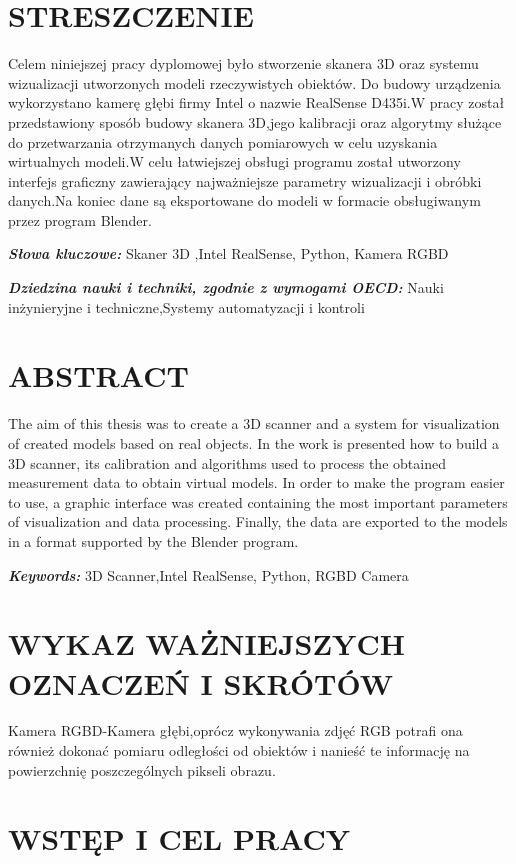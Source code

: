 \documentclass[12pt]{article}
\providecommand{\keywordspl}[1]
{
  \small	
  \textbf{\textit{Słowa kluczowe:}} #1
}
\providecommand{\keywordseng}[1]
{
  \small	
  \textbf{\textit{Keywords:}} #1
}
\providecommand{\dnauki}[1]
{
  \small	
  \textbf{\textit{Dziedzina nauki i techniki, zgodnie z wymogami OECD:}} #1
}
\begin{document}
\section*{STRESZCZENIE}
Celem niniejszej pracy dyplomowej było stworzenie skanera 3D oraz systemu wizualizacji utworzonych modeli rzeczywistych obiektów. Do budowy urządzenia wykorzystano kamerę głębi firmy Intel o nazwie RealSense D435i.W pracy został przedstawiony sposób budowy skanera 3D,jego kalibracji oraz algorytmy służące do przetwarzania otrzymanych danych pomiarowych w celu uzyskania wirtualnych modeli.W celu łatwiejszej obsługi programu został utworzony interfejs graficzny zawierający najważniejsze parametry wizualizacji i obróbki danych.Na koniec dane są eksportowane do modeli w formacie obsługiwanym przez program Blender.

\keywordspl{Skaner 3D ,Intel RealSense, Python, Kamera RGBD}

\dnauki{Nauki inżynieryjne i techniczne,Systemy automatyzacji i kontroli }

\section*{ABSTRACT}
The aim of this thesis was to create a 3D scanner and a system for visualization of created models based on real objects. In the work is presented how to build a 3D scanner, its calibration and algorithms used to process the obtained measurement data to obtain virtual models. In order to make the program easier to use, a graphic interface was created containing the most important parameters of visualization and data processing. Finally, the data are exported to the models in a format supported by the Blender program.

\keywordseng{3D Scanner,Intel RealSense, Python, RGBD Camera}
\newpage
\tableofcontents





\newpage
\section{WYKAZ WAŻNIEJSZYCH OZNACZEŃ I SKRÓTÓW}

Kamera RGBD-Kamera głębi,oprócz wykonywania zdjęć RGB potrafi ona również dokonać pomiaru odległości od obiektów i nanieść te informację na powierzchnię poszczególnych pikseli obrazu.

\section{WSTĘP I CEL PRACY}
\end{document}
